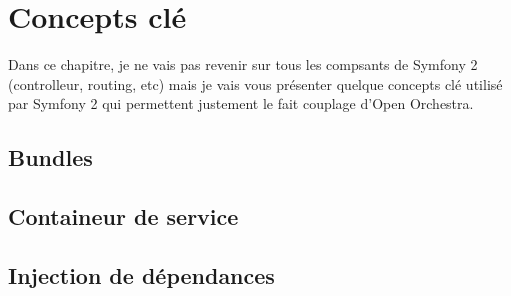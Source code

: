 \chapter{Concepts clé }
Dans ce chapitre, je ne vais pas revenir sur tous les compsants de Symfony 2 (controlleur, routing, etc) mais je vais vous présenter quelque concepts clé utilisé par Symfony 2 qui permettent justement le fait couplage d'Open Orchestra.
\section{Bundles}
\section{Containeur de service}
\section{Injection de dépendances}